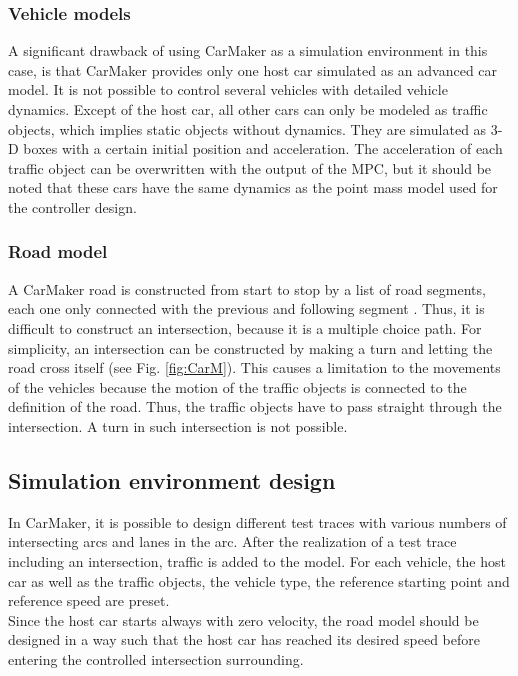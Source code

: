 \documentclass[letterpaper,10pt,conference]{ieeeconf}
\begin{document}
\subsubsection{Vehicle models}
A significant drawback of using CarMaker as a simulation environment in this case, is that CarMaker provides only one host car simulated as an advanced car model. It is not possible to control several vehicles with detailed vehicle dynamics. Except of the host car, all other cars can only be modeled as traffic objects, which implies static objects without dynamics. They are simulated as 3-D boxes with a certain initial position and acceleration. The acceleration of each traffic object can be overwritten with the output of the MPC, but it should be noted that these cars have the same dynamics as the point mass model used for the controller design.
\subsubsection{Road model}
A CarMaker road is constructed from start to stop by a list of road segments, each one only connected with the previous and following segment \cite{guide}. Thus, it is difficult to construct an intersection, because it is a multiple choice path. For simplicity, an intersection can be constructed by making a turn and letting the road cross itself (see Fig. \ref{fig:CarM}). This causes a limitation to the movements of the vehicles because the motion of the traffic objects is connected to the definition of the road. Thus, the traffic objects have to pass straight through the intersection. A turn in such intersection is not possible.
\subsection{Simulation environment design}
In CarMaker, it is possible to design different test traces with various numbers of intersecting arcs and lanes in the arc. After the realization of a test trace including an intersection, traffic is added to the model. For each vehicle, the host car as well as the traffic objects, the vehicle type, the reference starting point and reference speed are preset.\\ \indent
Since the host car starts always with zero velocity, the road model should be designed in a way such that the host car has reached its desired speed before entering the controlled intersection surrounding.
\end{document}

